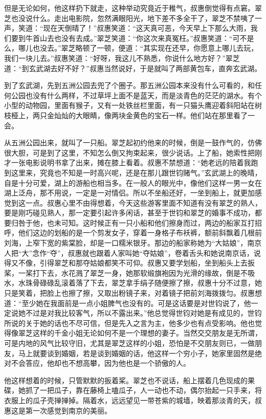 \par 但是无论如何，他这样扔下就走，这种举动究竟近于稚气，叔惠倒觉得有点窘。翠芝也没说什么。走出电影院，忽然满眼阳光，地下差不多全干了，翠芝不禁咦了一声，笑道：“现在天倒晴了！”叔惠笑道：“这天真可恶，今天早上下那么大雨，我们要到牛首山去也没有去成。”翠芝笑道：“你这次来真冤枉。”叔惠笑道：“可不是么，哪儿也没去。”翠芝略顿了一顿，便道：“其实现在还早，你愿意上哪儿去玩，我们一块儿去。”叔惠笑道：“好呀，我这儿不熟悉，你说什么地方好？”翠芝道：“到玄武湖去好不好？”叔惠当然说好，于是就叫了两部黄包车，直奔玄武湖。
\par 到了玄武湖，先到五洲公园去兜了个圈子。那五洲公园本来没有什么可看的，和任何公园也没有什么两样，不过草坪上面不是蓝天，而是淡青色的茫茫的湖水。有个小型的动物园，里面有猴子，又有一处铁丝栏里面，有一只猫头鹰迎着斜阳站在树枝桠上，两只金灿灿的大眼睛，像两块金黄色的宝石一样。他们站在那里看了一会。
\par 从五洲公园出来，就叫了一只船。翠芝起初约他来的时候，倒是一鼓作气的，仿佛很大胆，可是到了这里，不知怎么倒又拘束起来，很少说话。上了船，她索性把刚才一张电影说明书拿了出来，摊在膝上看着。叔惠不禁想道：“她老远的陪着我跑到这里来，究竟也不知是一时高兴呢，还是在那儿跟世钧赌气。”玄武湖上的晚晴，自是十分可爱，湖上的游船也相当多。在一般人的眼光中，像他们这样一男一女在湖上泛舟，那不用说，一定是一对情侣。所以不坐船还好，一坐到船上，就更加感觉到这一点。叔惠心里不由得想着，今天这些游客里面不知道有没有翠芝的熟人，要是刚巧碰见熟人，那一定要引起许多闲话，甚至于世钧和翠芝的婚事不成功，都要归咎于他，也未可知。这时候正有一只小船和他们擦身而过，两边的船家互打招呼，他们这边的划船的是一个剪发女子，穿着一身格子布袄裤，额前斜飘着几根前刘海，上窄下宽的紫棠脸，却是一口糯米银牙。那边的船家称她为“大姑娘”，南京人把“大”念作“夺”，叔惠就也跟着人家叫她“夺姑娘”，卷着舌头和她说南京话，说得又不像，引得翠芝和那夺姑娘都笑不可仰。叔惠又要学划船，坐到船头上去扳桨，一桨打下去，水花溅了翠芝一身，她那软缎旗袍因为光滑的缘故，倒是不吸水，水珠骨碌碌乱滚着落了下去，翠芝拿手绢子随便擦了擦，叔惠十分不过意，她只是笑着，把脸上也擦了擦，又取出粉镜子来，对着镜子把前刘海拨拨匀。叔惠想道：“至少她在我面前是一点小姐脾气也没有的。可是这话要是对世钧说了，他一定说她不过是对我比较客气，所以不露出来。”他总觉得世钧对她是有成见的，世钧所说的关于她的话也不尽可信，但是先入之言为主，他多少也有点受影响。他也觉得像翠芝这样的千金小姐无论如何不是一个理想的妻子。当然交交朋友是无所谓，可是内地的风气比较守旧，尤其是翠芝这样的小姐，恐怕是不交朋友则已，一做朋友，马上就要谈到婚姻，若是谈到婚姻的话，他这样一个穷小子，她家里固然是绝对不会答应，他却也不想高攀，因为他也是一个骄傲的人。
\par 他这样想着的时候，只管默默的扳着桨。翠芝也不说话，船上摆着几色现成的果碟，她抓了一把瓜子，靠在藤椅上嗑瓜子，人一动也不动，偶尔抬起一只手来，将衣服上的瓜子壳掸掸掉。隔着水，远远望见一带苍紫的城墙，映着那淡青的天，叔惠这是第一次感觉到南京的美丽。
